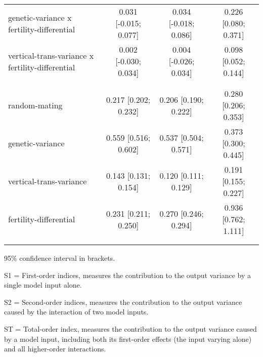 \begin{table}[htp]
\begin{threeparttable}
\begin{tabular}{lccc}
	  \hspace{1.5em} genetic-variance x fertility-differential & 0.031 [-0.015; 0.077]   & 0.034 [-0.018; 0.086]   & 0.226 [0.080; 0.371] \\
	  \hspace{1.5em} vertical-trans-variance x fertility-differential & 0.002 [-0.030; 0.034]   & 0.004 [-0.026; 0.034]   & 0.098 [0.052; 0.144] \\
	 \\
    \addlinespace[12pt]
    \multicolumn{4}{l}{\hspace{1em} ST} \\ 
\hspace{1.5em} random-mating & 0.217 [0.202; 0.232]   & 0.206 [0.190; 0.222]   & 0.280 [0.206; 0.353] \\
	  \hspace{1.5em} genetic-variance & 0.559 [0.516; 0.602]   & 0.537 [0.504; 0.571]   & 0.373 [0.300; 0.445] \\
	  \hspace{1.5em} vertical-trans-variance & 0.143 [0.131; 0.154]   & 0.120 [0.111; 0.129]   & 0.191 [0.155; 0.227] \\
	  \hspace{1.5em} fertility-differential & 0.231 [0.211; 0.250]   & 0.270 [0.246; 0.294]   & 0.936 [0.762; 1.111] \\
	 \\
    \addlinespace
    \hline
    \end{tabular}
    \begin{tablenotes}
    \scriptsize
    \item 95\% confidence interval in brackets.
    \item S1 = First-order indices,  measures the contribution to the output variance by a single model input alone.
    \item S2 = Second-order indices,  measures the contribution to the output variance caused by the interaction of two model inputs.
    \item ST = Total-order index, measures the contribution to the output variance caused by a model input, including both its first-order effects (the input varying alone) and all higher-order interactions.
    \end{tablenotes}
    \end{threeparttable}
    \end{table}